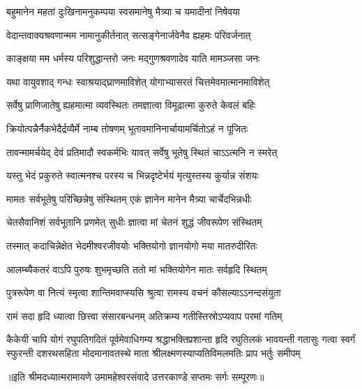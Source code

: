 \twolineshloka
{बहुमानेन महतां दुःखिनामनुकम्पया}
{स्वसमानेषु मैत्र्या च यमादीनां निषेवया} %

\twolineshloka
{वेदान्तवाक्यश्रवणान्मम नामानुकीर्तनात्}
{सत्सङ्गेनार्जवेनैव ह्यहमः परिवर्जनात्} %

\twolineshloka
{काङ्क्षया मम धर्मस्य परिशुद्धान्तरो जनः}
{मद्गुणश्रवणादेव याति मामञ्जसा जनः} %

\twolineshloka
{यथा वायुवशाद् गन्धः स्वाश्रयाद्\mbox{}घ्राणमाविशेत्}
{योगाभ्यासरतं चित्तमेवमात्मानमाविशेत्} %

\twolineshloka
{सर्वेषु प्राणिजातेषु ह्यहमात्मा व्यवस्थितः}
{तमज्ञात्वा विमूढात्मा कुरुते केवलं बहिः} %

\twolineshloka
{क्रियोत्पन्नैर्नैकभेदैर्द्रव्यैर्मे नाम्ब तोषणम्}
{भूतावमानिनार्चायामर्चितोऽहं न पूजितः} %

\twolineshloka
{तावन्मामर्चयेद् देवं प्रतिमादौ स्वकर्मभिः}
{यावत् सर्वेषु भूतेषु स्थितं चाऽऽत्मनि न स्मरेत्} %

\twolineshloka
{यस्तु भेदं प्रकुरुते स्वात्मनश्च परस्य च}
{भिन्नदृष्टेर्भयं मृत्युस्तस्य कुर्यान्न संशयः} %

\twolineshloka
{मामतः सर्वभूतेषु परिच्छिन्नेषु संस्थितम्}
{एकं ज्ञानेन मानेन मैत्र्या चार्चेदभिन्नधीः} %

\twolineshloka
{चेतसैवानिशं सर्वभूतानि प्रणमेत् सुधीः}
{ज्ञात्वा मां चेतनं शुद्धं जीवरूपेण संस्थितम्} %

\twolineshloka
{तस्मात् कदाचिन्नेक्षेत भेदमीश्वरजीवयोः}
{भक्तियोगो ज्ञानयोगो मया मातरुदीरितः} %

\twolineshloka
{आलम्ब्यैकतरं वाऽपि पुरुषः शुभमृच्छति}
{ततो मां भक्तियोगेन मातः सर्वहृदि स्थितम्} %

\twolineshloka
{पुत्ररूपेण वा नित्यं स्मृत्वा शान्तिमवाप्स्यसि}
{श्रुत्वा रामस्य वचनं कौसल्याऽऽनन्दसंयुता} %

\twolineshloka
{रामं सदा हृदि ध्यात्वा छित्त्वा संसारबन्धनम्}
{अतिक्रम्य गतीस्तिस्रोऽप्यवाप परमां गतिम्} %

\setlength{\shlokaspaceskip}{10pt}
\fourlineindentedshloka
{कैकेयी चापि योगं रघुपतिगदितं पूर्वमेवाधिगम्य}
{श्रद्धाभक्तिप्रशान्ता हृदि रघुतिलकं भावयन्ती गतासुः}
{गत्वा स्वर्गं स्फुरन्ती दशरथसहिता मोदमानावतस्थे}
{माता श्रीलक्ष्मणस्याप्यतिविमलमतिः प्राप भर्तुः समीपम्} %
\setlength{\shlokaspaceskip}{24pt}

{॥इति श्रीमदध्यात्मरामायणे उमामहेश्वरसंवादे उत्तरकाण्डे सप्तमः
सर्गः सम्पूरणः॥}
